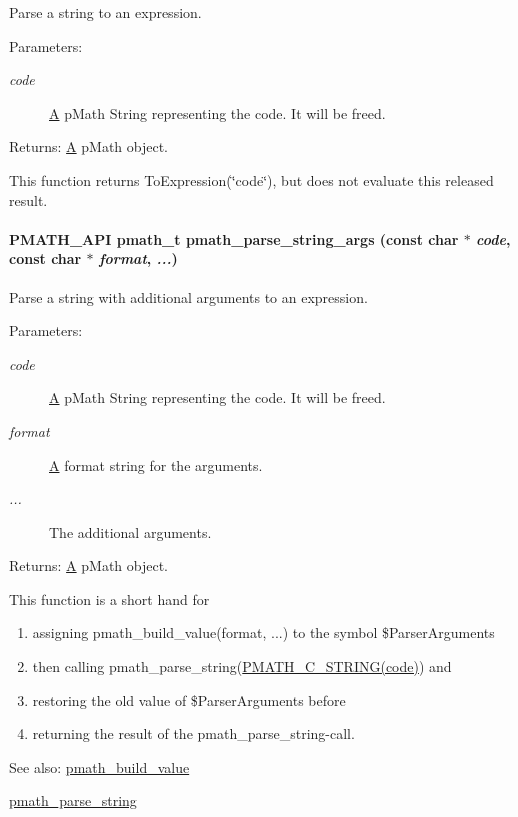 Parse a string to an expression. 

\begin{Desc}
\item[Parameters:]
\begin{description}
\item[{\em code}]\hyperlink{class_a}{A} pMath String representing the code. It will be freed. \end{description}
\end{Desc}
\begin{Desc}
\item[Returns:]\hyperlink{class_a}{A} pMath object.\end{Desc}
This function returns ToExpression(\char`\"{}code\char`\"{}), but does not evaluate this released result. \hypertarget{group__parser_gac02e250fcd91e4fc03f0f7e8a6dd571}{
\paragraph[{pmath\_\-parse\_\-string\_\-args}]{\setlength{\rightskip}{0pt plus 5cm}PMATH\_\-API {\bf pmath\_\-t} pmath\_\-parse\_\-string\_\-args (const char $\ast$ {\em code}, \/  const char $\ast$ {\em format}, \/   {\em ...})}\hfill}
\label{group__parser_gac02e250fcd91e4fc03f0f7e8a6dd571}


Parse a string with additional arguments to an expression. 

\begin{Desc}
\item[Parameters:]
\begin{description}
\item[{\em code}]\hyperlink{class_a}{A} pMath String representing the code. It will be freed. \item[{\em format}]\hyperlink{class_a}{A} format string for the arguments. \item[{\em ...}]The additional arguments. \end{description}
\end{Desc}
\begin{Desc}
\item[Returns:]\hyperlink{class_a}{A} pMath object.\end{Desc}
This function is a short hand for\begin{enumerate}
\item assigning pmath\_\-build\_\-value(format, ...) to the symbol \$ParserArguments\item then calling pmath\_\-parse\_\-string(\hyperlink{group__strings_g0b6ecb1bc5d8aeccbbfaeb72055c7ffc}{PMATH\_\-C\_\-STRING(code)}) and\item restoring the old value of \$ParserArguments before\item returning the result of the pmath\_\-parse\_\-string-call.\end{enumerate}


\begin{Desc}
\item[See also:]\hyperlink{group__helpers_g13a748aa283c5f5408cce037d3ad224d}{pmath\_\-build\_\-value} 

\hyperlink{group__parser_g30c73f2fbcd116125cb5befd26b35ec4}{pmath\_\-parse\_\-string} \end{Desc}

